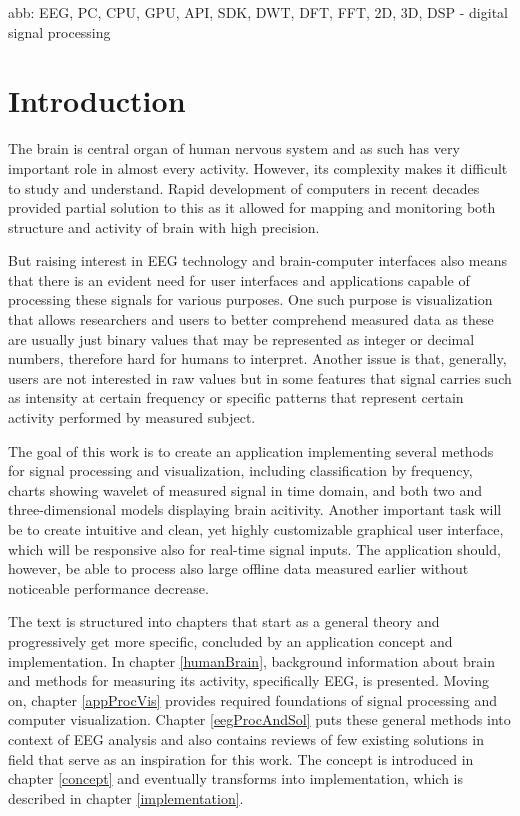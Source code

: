 abb:
EEG,
PC,
CPU,
GPU,
API,
SDK,
DWT,
DFT,
FFT,
2D,
3D,
DSP - digital signal processing

\chapter{Introduction}
The brain is central organ of human nervous system and as such has very
important role in almost every activity. However, its complexity makes it
difficult to study and understand. Rapid development of computers in recent
decades provided partial solution to this as it allowed for mapping and
monitoring both structure and activity of brain with high precision.

But raising interest in EEG technology and brain-computer interfaces also means
that there is an evident need for user interfaces and applications capable of
processing these signals for various purposes. One such purpose is visualization
that allows researchers and users to better comprehend measured data as these
are usually just binary values that may be represented as integer or decimal
numbers, therefore hard for humans to interpret. Another issue is that,
generally, users are not interested in raw values but in some features that
signal carries such as intensity at certain frequency or specific patterns that
represent certain activity performed by measured subject.

The goal of this work is to create an application implementing several
methods for signal processing and visualization, including classification by
frequency, charts showing wavelet of measured signal in time domain, and both
two and three-dimensional models displaying brain acitivity. Another important
task will be to create intuitive and clean, yet highly customizable graphical
user interface, which will be responsive also for real-time signal inputs. The
application should, however, be able to process also large offline data measured
earlier without noticeable performance decrease.

The text is structured into chapters that start as a general theory and
progressively get more specific, concluded by an application concept and
implementation. In chapter \ref{humanBrain}, background information about brain
and methods for measuring its activity, specifically EEG, is presented. Moving
on, chapter \ref{appProcVis} provides required foundations of signal processing
and computer visualization. Chapter \ref{eegProcAndSol} puts these general
methods into context of EEG analysis and also contains reviews of few existing
solutions in field that serve as an inspiration for this work. The concept is
introduced in chapter \ref{concept} and eventually transforms into
implementation, which is described in chapter \ref{implementation}.
 
